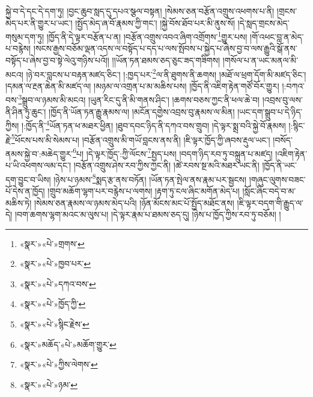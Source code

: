 སྐྱེ་བ་དེ་དང་དེ་དག་ཏུ། །བྱང་ཆུབ་སླད་དུ་དཔའ་སྩལ་བསྟན། །སེམས་ཅན་བརྩོན་འགྲུས་འཕགས་པ་ནི། །གྲངས་མེད་པར་ནི་གྱུར་པ་ཡང་། །སྤྱོད་མེད་ཞ་བོ་རྣམས་ཀྱི་གང་། །སྐྱེ་བོས་ཐོབ་པར་མི་ནུས་སོ། །དེ་སླད་གྲངས་མེད་གསུམ་དག་ཏུ། །ཁྱོད་ནི་དེ་ལྟར་བརྩོན་པ་ན། །བརྩོན་འགྲུས་འབའ་ཞིག་འགྲོགས་\footnote{«སྣར་»«པེ་»གྲགས་}གྱུར་པས། །གོ་འཕང་བླ་ན་མེད་པ་བརྙེས། །སངས་རྒྱས་བཅོམ་ལྡན་འདས་ལ་བསྟོད་པ་དད་པ་ལས་སྤོབས་པ་སྐྱེད་པ་ཞེས་བྱ་བ་ལས་རྒྱུའི་སྒོ་ནས་བསྟོད་པ་ཞེས་བྱ་བ་སྟེ་ལེའུ་གཉིས་པའོ།། །།ཡོན་ཏན་ཐམས་ཅད་ཅུང་ཟད་གཟིགས། །གསོལ་པ་ན་ཡང་མནལ་མི་མངའ། །ཉེ་བར་བླངས་པ་བརྟན་མཛད་ཅིང་། །:ཁྱད་པར་\footnote{«སྣར་»«པེ་»ཁྱབ་པར་}ལ་ནི་ཐུགས་ནི་ཆགས། །མཐོ་ལ་ཕྲག་དོག་མི་མཛད་ཅིང་། །དམན་ལ་རྔན་ཆེན་མི་མཛད་ལ། །མཉམ་ལ་འགྲན་པ་མ་མཆིས་པས། །ཁྱོད་ནི་འཇིག་རྟེན་གཙོ་བོར་གྱུར། །:བཀའ་བས་\footnote{«སྣར་»«པེ་»དཀའ་བས་}སྒྲུབ་ལ་ཉམས་མི་མངའ། །ཡུན་རིང་དུ་ནི་མི་གནས་ཤིང་། །ཆགས་བཅས་ཀྱང་ནི་ཕལ་ཆེ་བ། །འབྲས་བུ་ལས་ནི་ཤིན་ཏུ་ཆུང་། །ཁྱོད་ནི་ཡོན་ཏན་རྒྱུ་རྣམས་ལ། །མངོན་དགྱེས་འབྲས་བུ་རྣམས་ལ་མིན། །ཡང་དག་སྒྲུབ་པ་དེ་ཉིད་ཀྱིས། །:ཁྱོད་ནི་\footnote{«སྣར་»«པེ་»ཁྱོད་ཀྱི་}ཡོན་ཏན་ཕ་མཐར་ཕྱིན། །ཐུབ་དབང་ཉིད་ནི་དཀའ་བས་གྲུབ། །དེ་ལྟར་སྨྲ་བའི་སྐྱེ་བོ་རྣམས། །:སྙིང་རྗེ་\footnote{«སྣར་»«པེ་»སྙིང་རྗེས་}ཕོངས་པས་མི་སེམས་པ། །བརྩོན་འགྲུས་མི་གཡོ་བླངས་ནས་ནི། །ཇི་ལྟར་ཁྱོད་ཀྱི་ཞབས་རྡུལ་ཡང་། །བསོད་ནམས་སྐྱེ་བ་:མཆེད་གྱུར་\footnote{«སྣར་»མཆོད་«པེ་»མཆོག་གྱུར་}པ། །དེ་ལྟར་ཁྱོད་:ཀྱི་ལོངས་\footnote{«སྣར་»«པེ་»ཀྱིས་ལེགས་}སྤྱད་པས། །བདག་ཉིད་རབ་ཏུ་བསྐྲུན་པ་མཛད། །འཇིག་རྟེན་པ་ཡི་འཕགས་ལམ་དང་། །བརྩོན་འགྲུས་ཤེས་རབ་ཀྱིས་ཀྱང་ནི། །ཚེ་རབས་སྔ་མའི་མཐར་ཡང་ནི། །ཁྱོད་ནི་ཡང་དག་བྱུང་བ་ཡིས། །ཉེས་པ་ཉམས་\footnote{«སྣར་»«པེ་»ཉམ་}སྨད་རྩ་ནས་བཏོན། །ཡོན་ཏན་སྤེལ་ནས་རྣམ་པར་སྦྱངས། །གཞུང་ལུགས་བཟང་པོ་དེས་ན་ཁྱོད། །གྲུབ་མཆོག་ལྷག་པར་བརྙེས་པ་ལགས། །རྟག་ཏུ་ངལ་ཞིང་མགོན་མེད་པ། །སློང་ཞིང་བདེ་བ་མ་མཆིས་ཏེ། །སེམས་ཅན་རྣམས་ལ་ཉམས་མེད་པའི། །ཉོན་མོངས་མང་པོ་སྤྱོད་མཐོང་ནས། །ཇི་ལྟར་བདག་གི་རྒྱུད་ལ་དེ། །བག་ཆགས་ལྷག་མའང་མ་ལུས་པ། །དེ་ལྟར་རྣམ་པ་ཐམས་ཅད་དུ། །ཉེས་པ་ཁྱོད་ཀྱིས་རབ་ཏུ་བཅོམ། །

